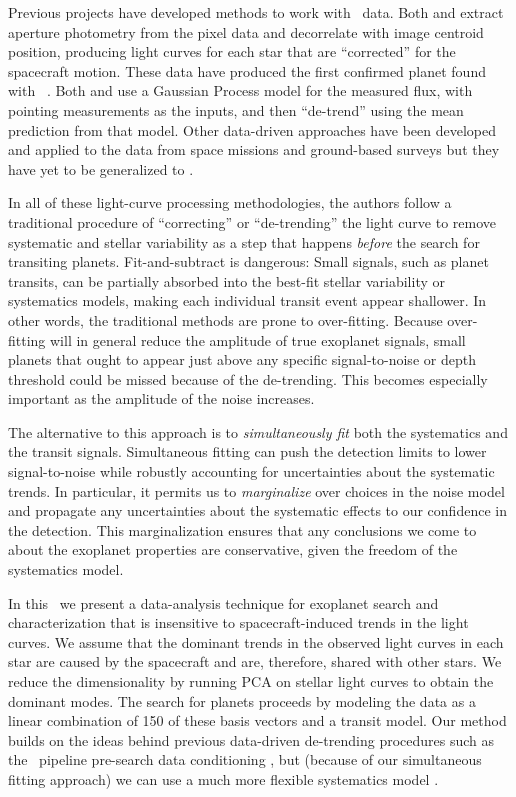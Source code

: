 Previous projects have developed methods to work with \KT\ data.
Both \citet{Vanderburg:2014} and \citet{Armstrong:2014}
extract aperture photometry from the pixel data
and decorrelate with image centroid position, producing light curves for each
star that are ``corrected'' for the spacecraft motion.
These data have produced the first confirmed planet found with
\KT\ \citep{Vanderburg:2015}.
Both \citet{Aigrain:2015} and \citet{Crossfield:2015} use a Gaussian Process
model for the measured flux, with pointing measurements as the inputs, and
then ``de-trend'' using the mean prediction from that model.
Other data-driven approaches have been developed and applied to the data from
space missions \citep[for example,][]{Ofir:2010, Stumpe:2012, Smith:2012,
Petigura:2013, Wang:2015} and ground-based surveys \citep[for
example,][]{Kovacs:2005, Tamuz:2005, Berta:2012} but they have yet to be
generalized to \KT.

In all of these light-curve processing methodologies, the authors follow a
traditional procedure of ``correcting'' or ``de-trending'' the light curve to
remove systematic and stellar variability as a step that happens \emph{before}
the search for transiting planets.
Fit-and-subtract is dangerous:
Small signals, such as planet transits, can be
partially absorbed into the best-fit stellar variability or systematics
models, making each individual transit event appear shallower.
In other words, the traditional methods are prone to over-fitting.
Because over-fitting will in general reduce the amplitude of true exoplanet
signals, small planets that ought to appear just above any specific
signal-to-noise or depth threshold could be missed because of the de-trending.
This becomes especially important as the amplitude of the noise increases.

The alternative to this approach is to \emph{simultaneously fit} both the
systematics and the transit signals.
Simultaneous fitting can push the detection limits to lower signal-to-noise
while robustly accounting for uncertainties about the systematic trends.
In particular, it permits us to \emph{marginalize} over choices in the noise
model and propagate any uncertainties about the systematic effects
to our confidence in the detection.
This marginalization ensures that any conclusions we come to about the
exoplanet properties are conservative, given the freedom of the systematics
model.

In this \paper\ we present a data-analysis technique for exoplanet search and
characterization that is insensitive to spacecraft-induced trends in the light
curves.
We assume that the dominant trends in the observed light curves in each star
are caused by the spacecraft and are, therefore, shared with other stars.
We reduce the dimensionality by running PCA on stellar light curves to obtain
the dominant modes.
The search for planets proceeds by modeling the data as a linear combination
of 150 of these basis vectors and a transit model.
Our method builds on the ideas behind previous data-driven de-trending
procedures such as the \kepler\ pipeline pre-search data conditioning
\citep[\pdc;][]{Stumpe:2012, Smith:2012}, but (because of our simultaneous
fitting approach) we can use a much more flexible systematics model
.

